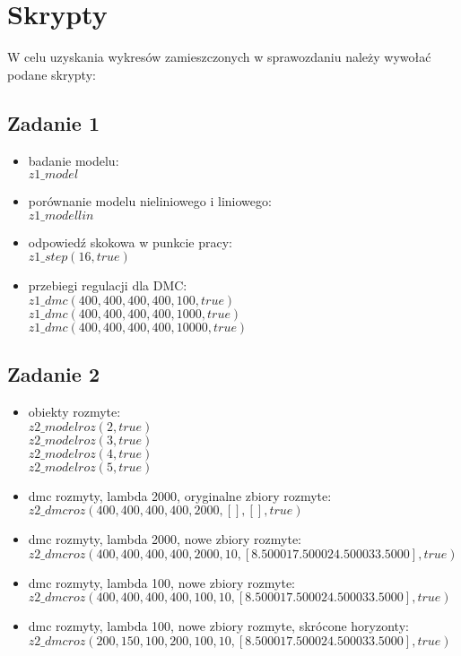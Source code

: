 \chapter{Skrypty}
	\label{ch:skrypty}
	W celu uzyskania wykresów zamieszczonych w sprawozdaniu należy wywołać podane skrypty:
	\section{Zadanie 1}
	\begin{itemize}
		\item badanie modelu:\\
		$z1\_model$
		\item porównanie modelu nieliniowego i liniowego:\\
		$z1\_modellin$
		\item odpowiedź skokowa w punkcie pracy:\\
		$z1\_step(16, true)$
		\item przebiegi regulacji dla DMC:\\
		$z1\_dmc(400, 400, 400, 400, 100, true)$\\
		$z1\_dmc(400, 400, 400, 400, 1000, true)$\\
		$z1\_dmc(400, 400, 400, 400, 10000, true)$\\	
	\end{itemize}
	\section{Zadanie 2}
	\begin{itemize}
		\item obiekty rozmyte:\\
		$z2\_modelroz(2, true)$\\
		$z2\_modelroz(3, true)$\\
		$z2\_modelroz(4, true)$\\
		$z2\_modelroz(5, true)$\\
		\item dmc rozmyty, lambda 2000, oryginalne zbiory rozmyte:\\
		$z2\_dmcroz(400, 400, 400, 400, 2000,[],[], true)$
		\item dmc rozmyty, lambda 2000, nowe zbiory rozmyte:\\
		$z2\_dmcroz(400, 400, 400, 400, 2000,10,[8.5000   17.5000   24.5000   33.5000], true)$
		\item dmc rozmyty, lambda 100, nowe zbiory rozmyte:\\
		$z2\_dmcroz(400, 400, 400, 400, 100,10,[8.5000   17.5000   24.5000   33.5000], true)$
		\item dmc rozmyty, lambda 100, nowe zbiory rozmyte, skrócone horyzonty:\\
		$z2\_dmcroz(200, 150, 100, 200, 100,10,[8.5000   17.5000   24.5000   33.5000], true)$
	\end{itemize}